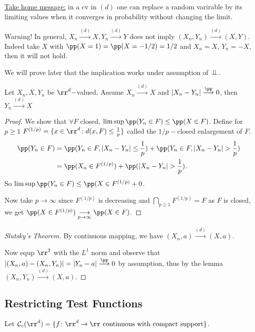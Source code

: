 \documentclass[../main.tex]{subfiles}
\begin{document}
\underline{\sffamily Take home message:} in a cv in $(d)$ one can replace a
random varirable by its limiting values when it converges in probability without
changing the limit.

{\color{red} Warning!} In general, $X_n \overset{(d)}{\longrightarrow} X, Y_n
\overset{(d)}{\longrightarrow} Y$ does not imply $(X_n, Y_n)
\overset{(d)}{\longrightarrow} (X, Y)$. Indeed take $X$ with $\pp(X = 1) = \pp(X
= -1/2) = 1/2$ and $X_n = X$, $Y_n = -X$, then it will not hold.

We will prove later that the implication works under assumption of $\perp\!\!\!\!\,\perp$.

\begin{lemma}
  Let $X_n, X, Y_n$ be $\rr^d-$valued. Assume $X_n
  \overset{(d)}{\longrightarrow} X$ and $|X_n - Y_n|
  \overset{\pp}{\longrightarrow} 0$, then $Y_n \overset{(d)}{\longrightarrow} X$
\end{lemma}
\begin{proof}
  We show that $\forall F$ closed, $\limsup \pp(Y_n \in F) \leq \pp(X \in F)$.
  Define for $p \geq 1$ $F^{(1/p)} = \{ x \in \rr^d \colon d(x, F) \leq
  \frac{1}{p}  \} $ called the $1/p-$closed enlargement of $F$.
  \begin{align*}
    \pp(Y_n \in F) &= \pp(Y_n \in F, |X_n - Y_n| \leq \frac{1}{p} ) + 
    \pp(Y_n \in F, |X_n - Y_n| > \frac{1}{p} )  \\
    &= \pp(X_n \in F^{(1/p)}) + \pp(|X_n - Y_n| > \frac{1}{p}).
  \end{align*}
  So $\limsup \pp(Y_n \in F) \leq \pp(X \in F^{(1/p)} + 0$. 

  Now take $p \to \infty$ since $F^{(1/p)}$ is decreasing and $\bigcap_{p \geq
  1} F^{(1/p)} = F$ as $F$ is closed, we get $\pp(X \in F^{(1/p)}) \underset{p
  \to \infty}{\longrightarrow} \pp(X \in F)$.
\end{proof}
\begin{proof}
  [Slutsky's Theorem]
  By continuous mapping, we have $(X_n, a) \overset{(d)}{\longrightarrow} (X,
  a)$. 

  Now equp $\rr^2$ with the $L^1$ norm and observe that $|(X_n, a) - (X_n, Y_n)|
  = |Y_n- a| \overset{\pp}{\longrightarrow} 0$ by assumption, thus by the lemma
  $(X_n, Y_n) \overset{(d)}{\longrightarrow} (X, a)$.
\end{proof}

\subsection{Restricting Test Functions}
Let $\mathcal{C}_c(\rr^d) = \{ f \colon \rr^d \to \rr \text{ continuous with
compact support} \} $.
\end{document}
